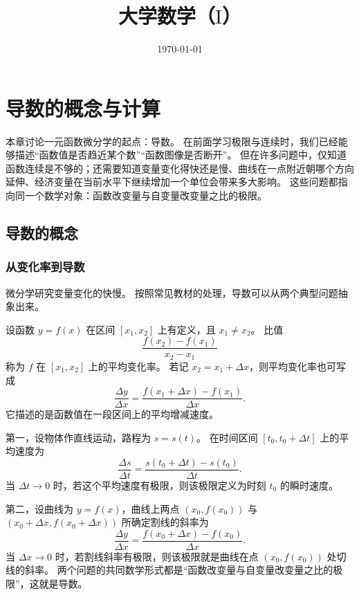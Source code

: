 \documentclass[fontset=fandol]{ctexart}
\title{大学数学（$ \mathrm{I} $）}
\author{}
\date{\today}
\begin{document}
\maketitle
\vspace{-1em}



\section{导数的概念与计算}

本章讨论一元函数微分学的起点：导数。 在前面学习极限与连续时，我们已经能够描述“函数值是否趋近某个数”“函数图像是否断开”。 但在许多问题中，仅知道函数连续是不够的；还需要知道变量变化得快还是慢、曲线在一点附近朝哪个方向延伸、经济变量在当前水平下继续增加一个单位会带来多大影响。 这些问题都指向同一个数学对象：函数改变量与自变量改变量之比的极限。


\subsection{导数的概念}
\subsubsection*{从变化率到导数}

微分学研究变量变化的快慢。 按照常见教材的处理，导数可以从两个典型问题抽象出来。

\begin{definition}[平均变化率]
设函数 $y=f(x)$ 在区间 $[x_1,x_2]$ 上有定义，且 $x_1\neq x_2$。 比值
\[
\frac{f(x_2)-f(x_1)}{x_2-x_1}
\]
称为 $f$ 在 $[x_1,x_2]$ 上的平均变化率。 若记 $x_2=x_1+\Delta x$，则平均变化率也可写成
\[
\frac{\Delta y}{\Delta x}
=\frac{f(x_1+\Delta x)-f(x_1)}{\Delta x}.
\]
它描述的是函数值在一段区间上的平均增减速度。
\end{definition}

第一，设物体作直线运动，路程为 $s=s(t)$。 在时间区间 $[t_0,t_0+\Delta t]$ 上的平均速度为
\[
\frac{\Delta s}{\Delta t}
=\frac{s(t_0+\Delta t)-s(t_0)}{\Delta t}.
\]
当 $\Delta t\to0$ 时，若这个平均速度有极限，则该极限定义为时刻 $t_0$ 的瞬时速度。

第二，设曲线为 $y=f(x)$，曲线上两点 $(x_0,f(x_0))$ 与 $(x_0+\Delta x,f(x_0+\Delta x))$ 所确定割线的斜率为
\[
\frac{\Delta y}{\Delta x}
=\frac{f(x_0+\Delta x)-f(x_0)}{\Delta x}.
\]
当 $\Delta x\to0$ 时，若割线斜率有极限，则该极限就是曲线在点 $(x_0,f(x_0))$ 处切线的斜率。 两个问题的共同数学形式都是“函数改变量与自变量改变量之比的极限”，这就是导数。
\end{document}

